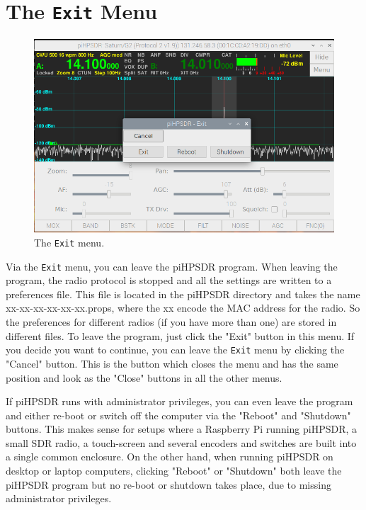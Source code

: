 \documentclass[12pt]{book}
\def\bltt#1{\texttt{\color{blue}#1}}
\begin{document}
\section{The \texttt{Exit} Menu}

\begin{figure}[ht]
\center
\includegraphics[width=12cm]{ExitMenu.png}
\caption{The \bltt{Exit} menu.}
\end{figure}

Via the \bltt{Exit} menu, you can leave the piHPSDR program. When leaving the program,
the radio protocol is stopped and all the settings are written to a preferences file. This
file is located in the piHPSDR directory and takes the name xx-xx-xx-xx-xx-xx.props, where
the xx encode the MAC address for the radio. So the preferences for different radios (if you
have more than one) are stored in different files. To leave the program, just click the
"Exit" button in this menu. If you decide you want to continue, you can leave the \bltt{Exit}
menu by clicking the "Cancel" button. This is the button which closes the menu and has
the same position and look as the "Close" buttons in all the other menus.

If piHPSDR runs with administrator privileges, you can even leave the program and either re-boot
or switch off the computer via the "Reboot" and "Shutdown" buttons. This makes sense for setups 
where a Raspberry Pi running piHPSDR, a small SDR radio, a touch-screen and several encoders
and switches are built into a single common enclosure. On the other hand, when running
piHPSDR on desktop or laptop computers, clicking "Reboot" or "Shutdown" both leave the piHPSDR
program but no re-boot or shutdown takes place, due to missing administrator privileges.
\end{document}
